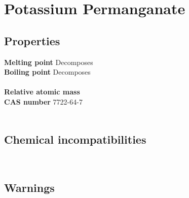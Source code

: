 \section{Potassium Permanganate}
\label{sec:chem-7722-64-7}
\subsection{Properties}
\textbf{Melting point} Decomposes\\
\textbf{Boiling point} Decomposes\\
\\
\textbf{Relative atomic mass} \\
\textbf{CAS number} 7722-64-7\\
\\
\subsection{Chemical incompatibilities}
\\
\subsection{Warnings}